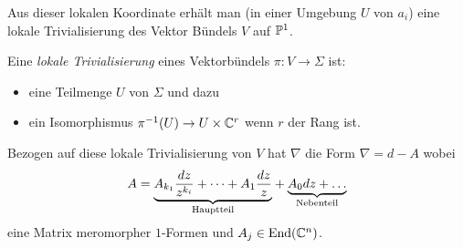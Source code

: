 Aus dieser lokalen Koordinate erhält man (in einer Umgebung $U$ von $a_i$) eine
lokale Trivialisierung des Vektor Bündels $V$ auf $\P^1$.
\begin{defn}
Eine \emph{lokale Trivialisierung} eines Vektorbündels $\pi:V\to\Sigma$ ist:
\begin{itemize}
\item eine Teilmenge $U$ von $\Sigma$ und dazu
\item ein Isomorphismus $\pi^{-1}(U)\to U\times\C^r$ wenn $r$ der Rang ist.
\end{itemize}
\end{defn}
\begin{comment}
Wähle an einem Punkt und setze von dort aus fort?!?
\end{comment}
Bezogen auf diese lokale Trivialisierung von $V$ hat $\nabla$ die Form
$\nabla=d-A$ wobei
\[
A=\underset{\text{Hauptteil}}{\underbrace{%
    A_{k_1}\frac{dz}{z^{k_i}} +\cdots+ A_{1}\frac{dz}{z}
  }} +
  \underset{\text{Nebenteil}}{\underbrace{A_0dz +\dots}}
\]
eine Matrix meromorpher $1$-Formen und $A_j\in\End(\C^n)$.
\begin{comment}
\begin{defn}
Eine meromorphe $1$-Form ist ein Element $\omega\in\Omega^1(V;\C)$ welche sich
als $\omega=udz$ mit meromorphen $u$ schreiben lässt.
\end{defn}
\end{comment}
\TODO{}


